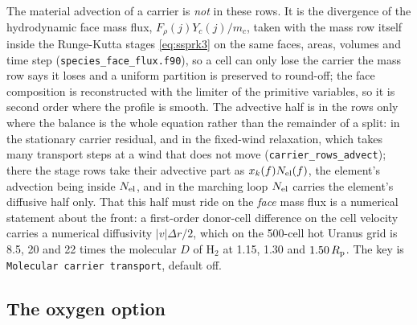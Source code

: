 The material advection of a carrier is \emph{not} in these rows. It is the
divergence of the hydrodynamic face mass flux, $F_\rho(j)Y_c(j)/m_c$, taken
with the mass row itself inside the Runge-Kutta stages \eqref{eq:ssprk3} on
the same faces, areas, volumes and time step
(\texttt{species\_face\_flux.f90}), so a cell
can only lose the carrier the mass row says it loses and a uniform partition
is preserved to round-off; the face composition is reconstructed with the
limiter of the primitive variables, so it is second order where the profile
is smooth. The advective half is in the rows only where the balance is the
whole equation rather than the remainder of a split: in the stationary
carrier residual, and in the fixed-wind relaxation, which takes many
transport steps at a wind that does not move (\texttt{carrier\_rows\_advect});
there the stage rows take their advective part as $x_k(f)N_{\rm el}(f)$, the
element's advection being inside $N_{\rm el}$, and in the marching loop
$N_{\rm el}$ carries the element's diffusive half only. That this half must ride on the \emph{face} mass flux is a numerical
statement about the front: a first-order donor-cell difference on the cell
velocity carries a numerical diffusivity $|v|\Delta r/2$, which on the
500-cell hot Uranus grid is 8.5, 20 and 22 times the molecular $D$ of H$_2$
at 1.15, 1.30 and $1.50\,R_{\rm p}$. The key is
\texttt{Molecular carrier transport}, default off.

\subsection{The oxygen option}
\label{sec:mol:oxygen}

